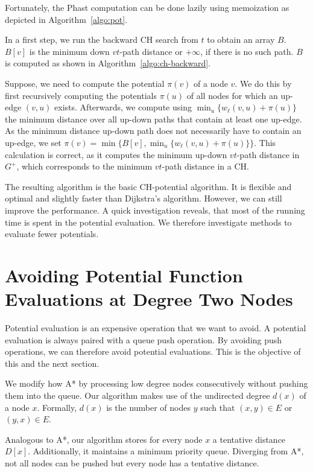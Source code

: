 \documentclass[a4paper,UKenglish,cleveref, autoref]{lipics-v2019}
\begin{document}
Fortunately, the Phast computation can be done lazily using memoization as depicted in Algorithm~\ref{algo:pot}.

In a first step, we run the backward CH search from $t$ to obtain an array $B$.
$B[v]$ is the minimum down $vt$-path distance or $+\infty$, if there is no such path.
$B$ is computed as shown in Algorithm~\ref{algo:ch-backward}.

Suppose, we need to compute the potential $\pi(v)$ of a node $v$.
We do this by first recursively computing the potentials $\pi(u)$ of all nodes for which an up-edge $(v,u)$ exists.
Afterwards, we compute using $\min_u\{w_\ell(v,u) + \pi(u)\}$ the minimum distance over all up-down paths that contain at least one up-edge.
As the minimum distance up-down path does not necessarily have to contain an up-edge, we set $\pi(v) = \min \{ B[v], \min_u\{w_\ell(v,u) + \pi(u)\} \}$.
This calculation is correct, as it computes the minimum up-down $vt$-path distance in $G^+$, which corresponds to the minimum $vt$-path distance in a CH.

The resulting algorithm is the basic CH-potential algorithm.
It is flexible and optimal and slightly faster than Dijkstra's algorithm.
However, we can still improve the performance.
A quick investigation reveals, that most of the running time is spent in the potential evaluation.
We therefore investigate methods to evaluate fewer potentials.

\section{Avoiding Potential Function Evaluations at Degree Two Nodes}

Potential evaluation is an expensive operation that we want to avoid.
A potential evaluation is always paired with a queue push operation.
By avoiding push operations, we can therefore avoid potential evaluations.
This is the objective of this and the next section.

We modify how A* by processing low degree nodes consecutively without pushing them into the queue.
Our algorithm makes use of the undirected degree $d(x)$ of a node $x$.
Formally, $d(x)$ is the number of nodes $y$ such that $(x,y)\in E$ or $(y,x)\in E$.

Analogous to A*, our algorithm stores for every node $x$ a tentative distance $D[x]$.
Additionally, it maintains a minimum priority queue.
Diverging from A*, not all nodes can be pushed but every node has a tentative distance.
\end{document}
